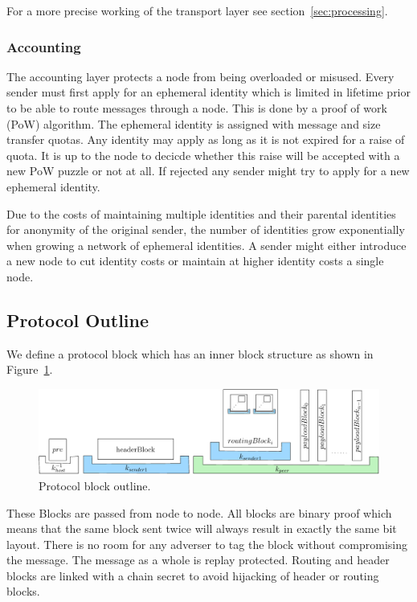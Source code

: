 \documentclass[9pt,journal,compsoc]{IEEEtran}
\begin{document}
For a more precise working of the transport layer see section~\ref{sec:processing}.

\subsubsection{Accounting}
The accounting layer protects a node from being overloaded or misused. Every sender must first apply for an ephemeral identity which is limited in lifetime prior to be able to route messages through a node. This is done by a proof of work (PoW) algorithm. The ephemeral identity is assigned with message and size transfer quotas. Any identity may apply as long as it is not expired for a raise of quota. It is up to the node to decicde whether this raise will be accepted with a new PoW puzzle or not at all. If rejected any sender might try to apply for a new ephemeral identity.

Due to the costs of maintaining multiple identities and their parental identities for anonymity of the original sender, the number of identities grow exponentially when growing a network of ephemeral identities. A sender might either introduce a new node to cut identity costs or maintain at higher identity costs a single node.

\subsection{Protocol Outline}
We define a protocol block which has an inner block structure as shown in Figure~\ref{fig:blocks}.

\begin{figure}[!t]
	\centering
	\includegraphics[width=\columnwidth]{../inc/blockLayoutSimplified}
	\caption{Protocol block outline.}
	\label{fig:blocks}
\end{figure}

These Blocks are passed from node to node. All blocks are binary proof which means that the same block sent twice will always result in exactly the same bit layout. There is no room for any adverser to tag the block without compromising the message. The message as a whole is replay protected. Routing and header blocks are linked with a chain secret to avoid hijacking of header or routing blocks.
\end{document}
